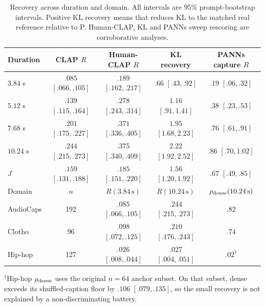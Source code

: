 \begin{table}[t]
\centering
\caption{Recovery across duration and domain. All intervals are $95\%$ prompt-bootstrap intervals. Positive KL recovery means that \PFT{} reduces KL to the matched real reference relative to P. Human-CLAP, KL and PANNs sweep rescoring are corroborative analyses.}
\label{tab:evidence}
\setlength{\tabcolsep}{4.2pt}
\begin{tabular}{@{}lcccc@{}}
\toprule
Duration & CLAP $R$ & Human-CLAP $R$ & KL recovery & PANNs capture $R$ \\
\midrule
$3.84$ s & $.085$ $[.066,.105]$ & $.189$ $[.162,.217]$ & $.66$ $[.43,.92]$ & $.19$ $[.06,.32]$ \\
$5.12$ s & $.139$ $[.115,.164]$ & $.278$ $[.243,.314]$ & $1.16$ $[.91,1.41]$ & $.38$ $[.23,.53]$ \\
$7.68$ s & $.201$ $[.175,.227]$ & $.371$ $[.336,.405]$ & $1.95$ $[1.68,2.23]$ & $.76$ $[.61,.91]$ \\
$10.24$ s & $.244$ $[.215,.273]$ & $.375$ $[.340,.409]$ & $2.22$ $[1.92,2.52]$ & $.86$ $[.70,1.02]$ \\
$J$ & $.159$ $[.131,.188]$ & $.185$ $[.151,.220]$ & $1.56$ $[1.20,1.92]$ & $.67$ $[.49,.85]$ \\
\midrule
Domain & $n$ & $R(3.84\,\mathrm{s})$ & $R(10.24\,\mathrm{s})$ & $\rho_{\rm dense}(10.24\,\mathrm{s})$ \\
\midrule
AudioCaps & 192 & $.085$ $[.066,.105]$ & $.244$ $[.215,.273]$ & $.82$ \\
Clotho & 96 & $.098$ $[.072,.125]$ & $.210$ $[.176,.243]$ & $.74$ \\
Hip-hop & 127 & $.026$ $[.008,.044]$ & $.027$ $[.004,.051]$ & $.02^{\dagger}$ \\
\bottomrule
\end{tabular}
\vspace{1pt}
\parbox{0.98\textwidth}{$^{\dagger}$Hip-hop $\rho_{\rm dense}$ uses the original $n=64$ anchor subset. On that subset, dense exceeds its shuffled-caption floor by $.106$ $[.079,.135]$, so the small recovery is not explained by a non-discriminating battery.}
\end{table}

